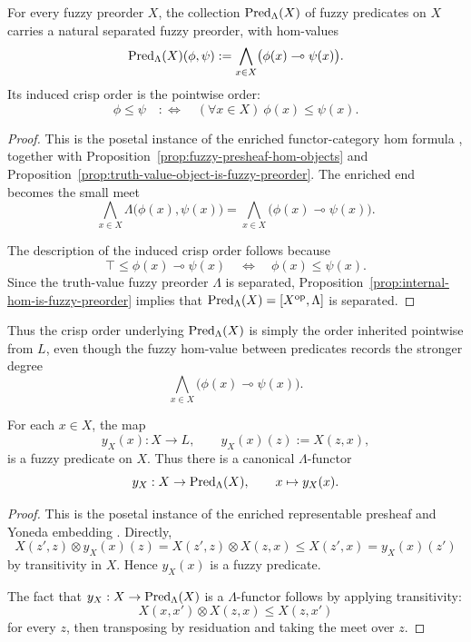 \begin{proposition}
\label{prop:predicates-form-fuzzy-order}
    For every fuzzy preorder \(X\), the collection \(\mathrm{Pred}_\Lambda(X)\) of fuzzy predicates on \(X\) carries a natural separated fuzzy preorder, with hom-values
    \[
        \mathrm{Pred}_\Lambda(X)(\phi,\psi)
        :=
        \bigwedge_{x\in X}\bigl(\phi(x)\multimap \psi(x)\bigr).
    \]
    Its induced crisp order is the pointwise order:
    \[
        \phi\leq \psi
        \quad:\Longleftrightarrow\quad
        (\forall x\in X)\ \phi(x)\leq \psi(x).
    \]
\end{proposition}

\begin{proof}
    This is the posetal instance of the enriched functor-category hom formula \cite[Section~2.2, formula~(2.10)]{Kelly1982BasicConcepts}, together with Proposition~\ref{prop:fuzzy-presheaf-hom-objects} and Proposition~\ref{prop:truth-value-object-is-fuzzy-preorder}. The enriched end becomes the small meet
    \[
        \bigwedge_{x\in X}
        \Lambda\bigl(\phi(x),\psi(x)\bigr)
        =
        \bigwedge_{x\in X}
        \bigl(\phi(x)\multimap \psi(x)\bigr).
    \]

    The description of the induced crisp order follows because
    \[
        \top\leq \phi(x)\multimap\psi(x)
        \quad\Longleftrightarrow\quad
        \phi(x)\leq\psi(x).
    \]
    Since the truth-value fuzzy preorder \(\Lambda\) is separated, Proposition~\ref{prop:internal-hom-is-fuzzy-preorder} implies that \(\mathrm{Pred}_\Lambda(X)=[X^{\mathrm{op}},\Lambda]\) is separated.
\end{proof}

Thus the crisp order underlying \(\mathrm{Pred}_\Lambda(X)\) is simply the order inherited pointwise from \(L\), even though the fuzzy hom-value between predicates records the stronger degree
\[
    \bigwedge_{x\in X}\bigl(\phi(x)\multimap\psi(x)\bigr).
\]

\begin{proposition}
\label{prop:representable-fuzzy-predicates}
    For each \(x\in X\), the map
    \[
        y_X(x):X\to L,
        \qquad
        y_X(x)(z):=X(z,x),
    \]
    is a fuzzy predicate on \(X\). Thus there is a canonical \(\Lambda\)-functor
    \[
        y_X:X\to \mathrm{Pred}_\Lambda(X),
        \qquad
        x\mapsto y_X(x).
    \]
\end{proposition}

\begin{proof}
    This is the posetal instance of the enriched representable presheaf and Yoneda embedding \cite[Section~1.9]{Kelly1982BasicConcepts}. Directly,
    \[
        X(z',z)\otimes y_X(x)(z)
        =
        X(z',z)\otimes X(z,x)
        \leq X(z',x)
        =
        y_X(x)(z')
    \]
    by transitivity in \(X\). Hence \(y_X(x)\) is a fuzzy predicate.

    The fact that \(y_X:X\to\mathrm{Pred}_\Lambda(X)\) is a \(\Lambda\)-functor follows by applying transitivity:
    \[
        X(x,x')\otimes X(z,x)\leq X(z,x')
    \]
    for every \(z\), then transposing by residuation and taking the meet over \(z\).
\end{proof}

